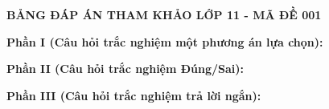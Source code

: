
\newpage
\begin{center} \textbf{BẢNG ĐÁP ÁN THAM KHẢO LỚP 11 - MÃ ĐỀ 001} \end{center}

\noindent \textbf{Phần I (Câu hỏi trắc nghiệm một phương án lựa chọn):}  

\noindent \textbf{Phần II (Câu hỏi trắc nghiệm Đúng/Sai):}

\noindent \textbf{Phần III (Câu hỏi trắc nghiệm trả lời ngắn):}

\label{B\thedeso}